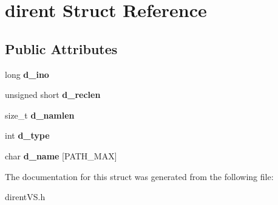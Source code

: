 \hypertarget{structdirent}{}\section{dirent Struct Reference}
\label{structdirent}
\subsection*{Public Attributes}
\begin{DoxyCompactItemize}
\item 
long {\bfseries d\+\_\+ino}\hypertarget{structdirent_acb6fecfb0e0f6fdc226dff8d56c3da4a}{}\label{structdirent_acb6fecfb0e0f6fdc226dff8d56c3da4a}

\item 
unsigned short {\bfseries d\+\_\+reclen}\hypertarget{structdirent_a90dc47836e8ef510437317876368859e}{}\label{structdirent_a90dc47836e8ef510437317876368859e}

\item 
size\+\_\+t {\bfseries d\+\_\+namlen}\hypertarget{structdirent_a09ced068b03cdb339e34840c8b709621}{}\label{structdirent_a09ced068b03cdb339e34840c8b709621}

\item 
int {\bfseries d\+\_\+type}\hypertarget{structdirent_ad6a736cb04c7295e8f97f708324b3500}{}\label{structdirent_ad6a736cb04c7295e8f97f708324b3500}

\item 
char {\bfseries d\+\_\+name} \mbox{[}P\+A\+T\+H\+\_\+\+M\+AX\mbox{]}\hypertarget{structdirent_a6c68ac080755453ec52de202e91de59b}{}\label{structdirent_a6c68ac080755453ec52de202e91de59b}

\end{DoxyCompactItemize}


The documentation for this struct was generated from the following file\+:\begin{DoxyCompactItemize}
\item 
dirent\+V\+S.\+h\end{DoxyCompactItemize}
